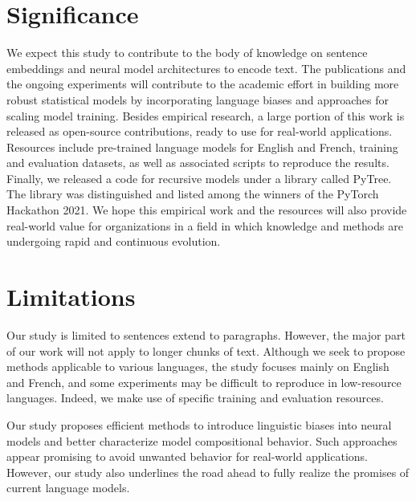 \section{Significance}


We expect this study to contribute to the body of knowledge on sentence embeddings and neural model architectures to encode text. The publications and the ongoing experiments will contribute to the academic effort in building more robust statistical models by incorporating language biases and approaches for scaling model training. Besides empirical research, a large portion of this work is released as open-source contributions, ready to use for real-world applications. Resources include pre-trained language models for English and French, training and evaluation datasets, as well as associated scripts to reproduce the results. Finally, we released a code for recursive models under a library called PyTree. The library was distinguished and listed among the winners of the PyTorch Hackathon 2021. We hope this empirical work and the resources will also provide real-world value for organizations in a field in which knowledge and methods are undergoing rapid and continuous evolution.

\section{Limitations}

Our study is limited to sentences  extend to paragraphs. However, the major part of our work will not apply to longer chunks of text. Although we seek to propose methods applicable to various languages, the study focuses mainly on English and French, and some experiments may be difficult to reproduce in low-resource languages. Indeed, we make use of specific training and evaluation resources.

Our study proposes efficient methods to introduce linguistic biases into neural models and better characterize model compositional behavior. Such approaches appear promising to avoid unwanted behavior for real-world applications. However, our study also underlines the road ahead to fully realize the promises of current language models.

